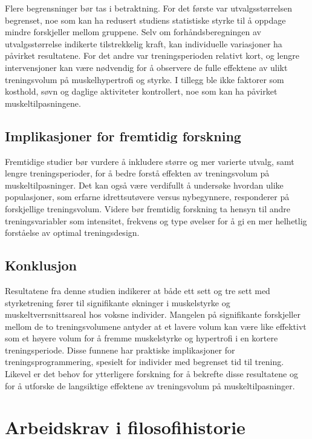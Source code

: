 \documentclass[
  letterpaper,
  DIV=11,
  numbers=noendperiod]{scrreprt}
\begin{document}
Flere begrensninger bør tas i betraktning. For det første var
utvalgsstørrelsen begrenset, noe som kan ha redusert studiens
statistiske styrke til å oppdage mindre forskjeller mellom gruppene.
Selv om forhåndsberegningen av utvalgsstørrelse indikerte tilstrekkelig
kraft, kan individuelle variasjoner ha påvirket resultatene. For det
andre var treningsperioden relativt kort, og lengre intervensjoner kan
være nødvendig for å observere de fulle effektene av ulikt treningsvolum
på muskelhypertrofi og styrke. I tillegg ble ikke faktorer som kosthold,
søvn og daglige aktiviteter kontrollert, noe som kan ha påvirket
muskeltilpasningene.

\section{Implikasjoner for fremtidig
forskning}\label{implikasjoner-for-fremtidig-forskning}

Fremtidige studier bør vurdere å inkludere større og mer varierte
utvalg, samt lengre treningsperioder, for å bedre forstå effekten av
treningsvolum på muskeltilpasninger. Det kan også være verdifullt å
undersøke hvordan ulike populasjoner, som erfarne idrettsutøvere versus
nybegynnere, responderer på forskjellige treningsvolum. Videre bør
fremtidig forskning ta hensyn til andre treningsvariabler som
intensitet, frekvens og type øvelser for å gi en mer helhetlig
forståelse av optimal treningsdesign.

\section{Konklusjon}\label{konklusjon-1}

Resultatene fra denne studien indikerer at både ett sett og tre sett med
styrketrening fører til signifikante økninger i muskelstyrke og
muskeltverrsnittsareal hos voksne individer. Mangelen på signifikante
forskjeller mellom de to treningsvolumene antyder at et lavere volum kan
være like effektivt som et høyere volum for å fremme muskelstyrke og
hypertrofi i en kortere treningsperiode. Disse funnene har praktiske
implikasjoner for treningsprogrammering, spesielt for individer med
begrenset tid til trening. Likevel er det behov for ytterligere
forskning for å bekrefte disse resultatene og for å utforske de
langsiktige effektene av treningsvolum på muskeltilpasninger.


\chapter{Arbeidskrav i
filosofihistorie}\label{arbeidskrav-i-filosofihistorie}
\end{document}

